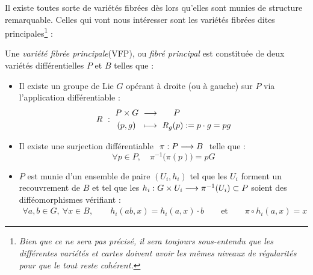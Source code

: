 Il existe toutes sorte de variétés fibrées dès lors qu'elles sont munies de structure remarquable. Celles qui vont nous intéresser sont les variétés fibrées dites principales\footnote{\itshape
	Bien que ce ne sera pas précisé, il sera toujours sous-entendu que les différentes variétés et cartes doivent avoir les mêmes niveaux de régularités pour que le tout reste cohérent.} :
\\
\begin{definition} \label{def:VFP}
	Une \emph{variété fibrée principale}(VFP), ou \emph{fibré principal} est constituée de deux variétés différentielles $P$ et $B$ telles que :
	\begin{itemize}
		\item Il existe un groupe de Lie $G$ opérant à droite (ou à gauche) sur $P$ via l'application différentiable :
		\begin{equation} \label{eq:VFP_action}
			R\ :\ \begin{aligned}P\times G\ &\lr\quad\ \ P \\ (p,g)\ \ &\lmt\ R_g(p)\defeq p\cdot g = pg
			\end{aligned}
		\end{equation}
		
		\item Il existe une surjection différentiable $\ \pi:P\longrightarrow B\ $ telle que :
		\begin{equation} \label{eq:VFP_fibres}
			\forall p\in P,\quad \pi^{-1}\big(\pi(p)\big)=pG
		\end{equation}
		
		\item $P$ est munie d'un ensemble de paire $(U_i, h_i)$ tel que les $U_i$ forment un recouvrement de $B$ et tel que les $h_i : G\times U_i\longrightarrow \pi^{-1}(U_i)\subset P$ soient des difféomorphismes vérifiant :
		\begin{align*} \label{eq:VFP_atlas}
			\forall a,b\in G,\ \forall x\in B,\qquad h_i(ab,x) = h_i(a,x) \cdot b\qquad \text{et} \qquad \pi\circ h_i(a,x) = x
		\end{align*}
	\end{itemize}
	

\end{definition}
